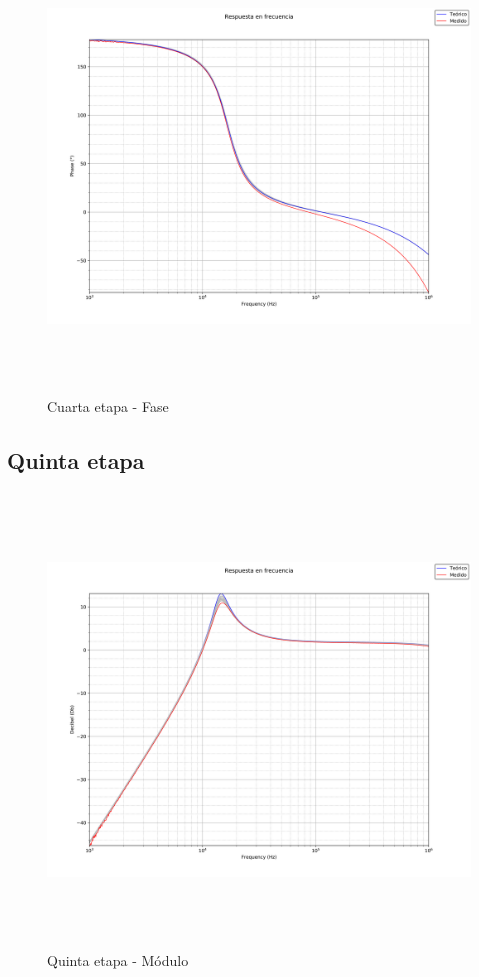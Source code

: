  \begin{figure}[H] %
	\centering
	\includegraphics[width=12cm,height=12cm,keepaspectratio]{../Imagenes/FOURTH_PHA.png}
	\caption{Cuarta etapa - Fase}
	\label{4P}
\end{figure}


\subsection{Quinta etapa}

 \begin{figure}[H] %
	\centering
	\includegraphics[width=12cm,height=12cm,keepaspectratio]{../Imagenes/FIFTH_MOD.png}
	\caption{Quinta etapa - M\'odulo}
	\label{fIFThmod}
\end{figure}

